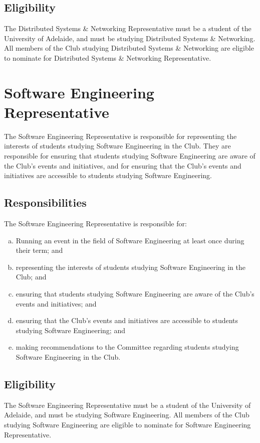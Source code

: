 \documentclass[11pt]{report}
\begin{document}
\subsection{Eligibility}
The Distributed Systems \& Networking Representative must be a student of the University of Adelaide, and must be studying Distributed Systems \& Networking. All members of the Club studying Distributed Systems \& Networking are eligible to nominate for Distributed Systems \& Networking Representative.

\section{Software Engineering Representative}
The Software Engineering Representative is responsible for representing the interests of students studying Software Engineering in the Club. They are responsible for ensuring that students studying Software Engineering are aware of the Club's events and initiatives, and for ensuring that the Club's events and initiatives are accessible to students studying Software Engineering.
\subsection{Responsibilities}
The Software Engineering Representative is responsible for:
\begin{enumerate}[(a)]
    \item Running an event in the field of Software Engineering at least once during their term; and
    \item representing the interests of students studying Software Engineering in the Club; and
    \item ensuring that students studying Software Engineering are aware of the Club's events and initiatives; and
    \item ensuring that the Club's events and initiatives are accessible to students studying Software Engineering; and
    \item making recommendations to the Committee regarding students studying Software Engineering in the Club.
\end{enumerate}
\subsection{Eligibility}
The Software Engineering Representative must be a student of the University of Adelaide, and must be studying Software Engineering. All members of the Club studying Software Engineering are eligible to nominate for Software Engineering Representative.
\end{document}
